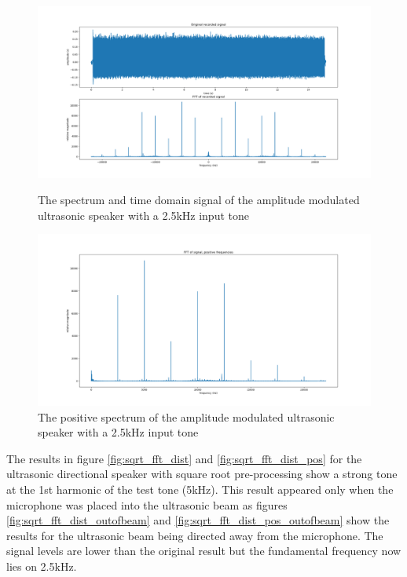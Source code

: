 \begin{figure}[ht!]
\begin{minipage}{0.49\textwidth}
            \centering
            \includegraphics[width=\textwidth]{Figures/Testing/Distortion/AM_fft_sig.png}
            \caption{The spectrum and time domain signal of the amplitude modulated ultrasonic speaker with a 2.5kHz input tone}
            \label{fig:AM_fft_dist}
        
        
            \centering
            \includegraphics[width=\textwidth]{Figures/Testing/Distortion/AM_fft_pos.png}
            \caption{The positive spectrum of the amplitude modulated ultrasonic speaker with a 2.5kHz input tone}
            \label{fig:AM_fft_dist_pos}
        
    \end{minipage}
\end{figure}

%    
%    
The results in figure \ref{fig:sqrt_fft_dist} and \ref{fig:sqrt_fft_dist_pos} for the ultrasonic directional speaker with square root pre-processing show a strong tone at the 1st harmonic of the test tone (5kHz). This result appeared only when the microphone was placed into the ultrasonic beam as figures  \ref{fig:sqrt_fft_dist_outofbeam} and \ref{fig:sqrt_fft_dist_pos_outofbeam} show the results for the ultrasonic beam being directed away from the microphone. The signal levels are lower than the original result but the fundamental frequency now lies on 2.5kHz.\\

